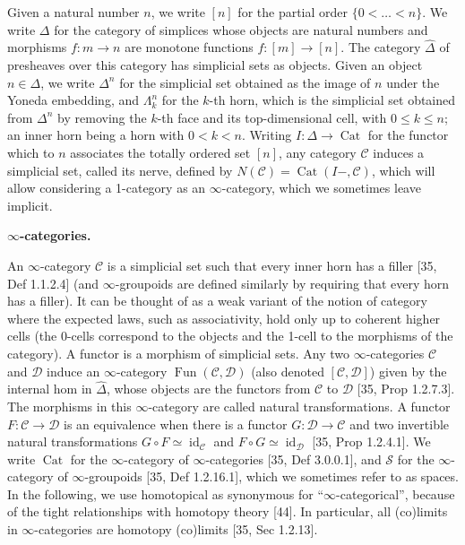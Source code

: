 Given a natural number $n$, we write $[n]$ for the partial order $\{0<\ldots<n\}$. We write $\Delta$ for the category of simplices whose objects are natural numbers and morphisms $f:m\to n$ are monotone functions $f:[m]\to[n]$. The category $\widehat{\Delta}$ of presheaves over this category has simplicial sets as objects. Given an object $n\in\Delta$, we write $\Delta^{n}$ for the simplicial set obtained as the image of $n$ under the Yoneda embedding, and $\Lambda^{n}_{k}$ for the $k$-th horn, which is the simplicial set obtained from $\Delta^{n}$ by removing the $k$-th face and its top-dimensional cell, with $0\leq k\leq n$; an inner horn being a horn with $0<k<n$. Writing $I:\Delta\to\operatorname{Cat}$ for the functor which to $n$ associates the totally ordered set $[n]$, any category $\mathcal{C}$ induces a simplicial set, called its nerve, defined by $N(\mathcal{C})=\operatorname{Cat}(I-,\mathcal{C})$, which will allow considering a 1-category as an $\infty$-category, which we sometimes leave implicit.\par
 
 
 
 
\par\medskip\noindent\textbf{$\infty$-categories.}\par
 
 
An $\infty$-category $\mathcal{C}$ is a simplicial set such that every inner horn has a filler [35, Def 1.1.2.4] (and $\infty$-groupoids are defined similarly by requiring that every horn has a filler). It can be thought of as a weak variant of the notion of category where the expected laws, such as associativity, hold only up to coherent higher cells (the 0-cells correspond to the objects and the 1-cell to the morphisms of the category). A functor is a morphism of simplicial sets. Any two $\infty$-categories $\mathcal{C}$ and $\mathcal{D}$ induce an $\infty$-category $\operatorname{Fun}(\mathcal{C},\mathcal{D})$ (also denoted $[\mathcal{C},\mathcal{D}]$) given by the internal hom in $\widehat{\Delta}$, whose objects are the functors from $\mathcal{C}$ to $\mathcal{D}$ [35, Prop 1.2.7.3]. The morphisms in this $\infty$-category are called natural transformations. A functor $F:\mathcal{C}\to\mathcal{D}$ is an equivalence when there is a functor $G:\mathcal{D}\to\mathcal{C}$ and two invertible natural transformations $G\circ F\simeq\operatorname{id}_{\mathcal{C}}$ and $F\circ G\simeq\operatorname{id}_{\mathcal{D}}$ [35, Prop 1.2.4.1]. We write $\operatorname{Cat}$ for the $\infty$-category of $\infty$-categories [35, Def 3.0.0.1], and $\mathcal{S}$ for the $\infty$-category of $\infty$-groupoids [35, Def 1.2.16.1], which we sometimes refer to as spaces. In the following, we use homotopical as synonymous for “$\infty$-categorical”, because of the tight relationships with homotopy theory [44]. In particular, all (co)limits in $\infty$-categories are homotopy (co)limits [35, Sec 1.2.13].\par
 
